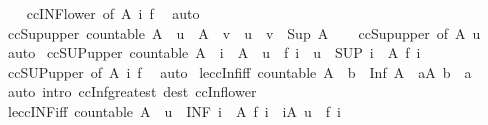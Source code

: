 \begin{isabellebody}
%
\isadelimproof
\ \ %
\endisadelimproof
%
\isatagproof
{}\isamarkupfalse%
\ ccINF{\isacharunderscore}lower\ {\isacharbrackleft}of\ A\ i\ f{\isacharbrackright}\ \isamarkupfalse%
\ auto%
\endisatagproof
{\isafoldproof}%
%
\isadelimproof
\isanewline
%
\endisadelimproof
\isanewline
{}\isamarkupfalse%
\ ccSup{\isacharunderscore}upper{}{\isacharcolon}\ {\isachardoublequoteopen}countable\ A\ {\isasymLongrightarrow}\ u\ {\isasymin}\ A\ {\isasymLongrightarrow}\ v\ {\isasymle}\ u\ {\isasymLongrightarrow}\ v\ {\isasymle}\ Sup\ A{\isachardoublequoteclose}\isanewline
%
\isadelimproof
\ \ %
\endisadelimproof
%
\isatagproof
{}\isamarkupfalse%
\ ccSup{\isacharunderscore}upper\ {\isacharbrackleft}of\ A\ u{\isacharbrackright}\ \isamarkupfalse%
\ auto%
\endisatagproof
{\isafoldproof}%
%
\isadelimproof
\isanewline
%
\endisadelimproof
\isanewline
{}\isamarkupfalse%
\ ccSUP{\isacharunderscore}upper{}{\isacharcolon}\ {\isachardoublequoteopen}countable\ A\ {\isasymLongrightarrow}\ i\ {\isasymin}\ A\ {\isasymLongrightarrow}\ u\ {\isasymle}\ f\ i\ {\isasymLongrightarrow}\ u\ {\isasymle}\ {\isacharparenleft}SUP\ i\ {\isasymin}\ A{\isachardot}\ f\ i{\isacharparenright}{\isachardoublequoteclose}\isanewline
%
\isadelimproof
\ \ %
\endisadelimproof
%
\isatagproof
{}\isamarkupfalse%
\ ccSUP{\isacharunderscore}upper\ {\isacharbrackleft}of\ A\ i\ f{\isacharbrackright}\ \isamarkupfalse%
\ auto%
\endisatagproof
{\isafoldproof}%
%
\isadelimproof
\isanewline
%
\endisadelimproof
\isanewline
{}\isamarkupfalse%
\ le{\isacharunderscore}ccInf{\isacharunderscore}iff{\isacharcolon}\ {\isachardoublequoteopen}countable\ A\ {\isasymLongrightarrow}\ b\ {\isasymle}\ Inf\ A\ {\isasymlongleftrightarrow}\ {\isacharparenleft}{\isasymforall}a{\isasymin}A{\isachardot}\ b\ {\isasymle}\ a{\isacharparenright}{\isachardoublequoteclose}\isanewline
%
\isadelimproof
\ \ %
\endisadelimproof
%
\isatagproof
{}\isamarkupfalse%
\ {\isacharparenleft}auto\ intro{\isacharcolon}\ ccInf{\isacharunderscore}greatest\ dest{\isacharcolon}\ ccInf{\isacharunderscore}lower{\isacharparenright}%
\endisatagproof
{\isafoldproof}%
%
\isadelimproof
\isanewline
%
\endisadelimproof
\isanewline
{}\isamarkupfalse%
\ le{\isacharunderscore}ccINF{\isacharunderscore}iff{\isacharcolon}\ {\isachardoublequoteopen}countable\ A\ {\isasymLongrightarrow}\ u\ {\isasymle}\ {\isacharparenleft}INF\ i\ {\isasymin}\ A{\isachardot}\ f\ i{\isacharparenright}\ {\isasymlongleftrightarrow}\ {\isacharparenleft}{\isasymforall}i{\isasymin}A{\isachardot}\ u\ {\isasymle}\ f\ i{\isacharparenright}{\isachardoublequoteclose}\isanewline

\end{isabellebody}
